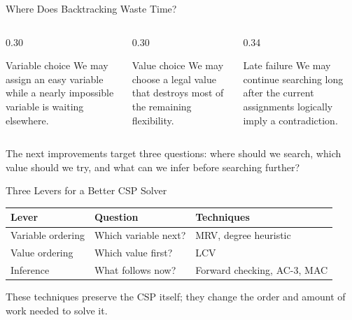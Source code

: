 \documentclass[aspectratio=169,10pt]{beamer}
\begin{document}
\begin{frame}[shrink=20]{Where Does Backtracking Waste Time?}
  \begin{columns}[T,onlytextwidth]
    \begin{column}{0.30\textwidth}
      \begin{block}{Variable choice}
        We may assign an easy variable while a nearly impossible variable is waiting elsewhere.
      \end{block}
    \end{column}

    \begin{column}{0.30\textwidth}
      \begin{block}{Value choice}
        We may choose a legal value that destroys most of the remaining flexibility.
      \end{block}
    \end{column}

    \begin{column}{0.34\textwidth}
      \begin{block}{Late failure}
        We may continue searching long after the current assignments logically imply a contradiction.
      \end{block}
    \end{column}
  \end{columns}

  \vspace{0.12in}
  \begin{keyidea}
    The next improvements target three questions: where should we search, which value should we try, and what can we infer before searching further?
  \end{keyidea}
\end{frame}

\begin{frame}[shrink=20]{Three Levers for a Better CSP Solver}
  \begin{center}
  \renewcommand{\arraystretch}{1.35}
  \begin{tabular}{l|l|l}
    \textbf{Lever} & \textbf{Question} & \textbf{Techniques} \\\hline
    Variable ordering & Which variable next? & MRV, degree heuristic \\
    Value ordering & Which value first? & LCV \\
    Inference & What follows now? & Forward checking, AC-3, MAC
  \end{tabular}
  \end{center}

  \begin{keyidea}
    These techniques preserve the CSP itself; they change the order and amount of work needed to solve it.
  \end{keyidea}
\end{frame}
\end{document}
